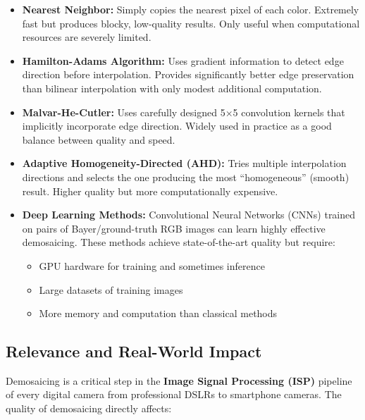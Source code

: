 \documentclass[12pt]{article}
\begin{document}
\begin{itemize}
    \item \textbf{Nearest Neighbor:} Simply copies the nearest pixel of each color\cite{shakhnarovich2008nearest}. Extremely fast but produces blocky, low-quality results. Only useful when computational resources are severely limited.
    
    \item \textbf{Hamilton-Adams Algorithm:} Uses gradient information to detect edge direction before interpolation. Provides significantly better edge preservation than bilinear interpolation with only modest additional computation.
    
    \item \textbf{Malvar-He-Cutler:} Uses carefully designed 5×5 convolution kernels that implicitly incorporate edge direction\cite{getreuer2011malvar}. Widely used in practice as a good balance between quality and speed.
    
    \item \textbf{Adaptive Homogeneity-Directed (AHD):} Tries multiple interpolation directions and selects the one producing the most ``homogeneous'' (smooth) result\cite{niu2018low}. Higher quality but more computationally expensive.
    
    \item \textbf{Deep Learning Methods:} Convolutional Neural Networks (CNNs) trained on pairs of Bayer/ground-truth RGB images can learn highly effective demosaicing\cite{zeng2024inheriting}. These methods achieve state-of-the-art quality but require:
    \begin{itemize}
        \item GPU hardware for training and sometimes inference
        \item Large datasets of training images
        \item More memory and computation than classical methods
    \end{itemize}
\end{itemize}

\subsection*{Relevance and Real-World Impact}

Demosaicing is a critical step in the \textbf{Image Signal Processing (ISP)} pipeline\cite{santos2025isp} of every digital camera from professional DSLRs to smartphone cameras. The quality of demosaicing directly affects:
\end{document}
